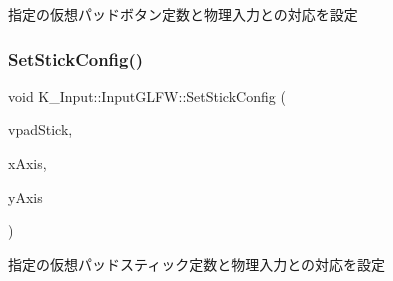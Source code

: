指定の仮想パッドボタン定数と物理入力との対応を設定 

\mbox{\label{class_k___input_1_1_input_g_l_f_w_a16d6ed6b11b759930d02655d208bdd3b}} 
\subsubsection{\texorpdfstring{Set\+Stick\+Config()}{SetStickConfig()}}
{\footnotesize\ttfamily void K\+\_\+\+Input\+::\+Input\+G\+L\+F\+W\+::\+Set\+Stick\+Config (\begin{DoxyParamCaption}\item[{\mbox{\hyperlink{namespace_k___input_a18bb7eb174cac2fd54b7a5b0d02a0116}{Vpad\+Stick}}}]{vpad\+Stick,  }\item[{\mbox{\hyperlink{namespace_k___input_ae7980bb169b8a865a5e67d6fe06fb729}{Vpad\+Axis}}}]{x\+Axis,  }\item[{\mbox{\hyperlink{namespace_k___input_ae7980bb169b8a865a5e67d6fe06fb729}{Vpad\+Axis}}}]{y\+Axis }\end{DoxyParamCaption})}



指定の仮想パッドスティック定数と物理入力との対応を設定 

